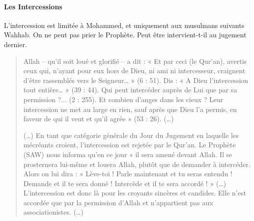 \paragraph{Les Intercessions} L'intercession est limitée à Mohammed, et uniquement aux musulmans suivants Wahhab. On ne peut pas prier le Prophète. Peut être intervient-t-il au jugement dernier.


\begin{quote}
Allah -- qu'il soit loué et glorifié -- a dit : « Et par ceci (le
Qur'an), avertis ceux qui, n'ayant pour eux hors de Dieu, ni ami ni
intercesseur, craignent d'être rassemblés vers le Seigneur\ldots{} » (6
: 51). Dis : « A Dieu l'intercession tout entière\ldots{} » (39 : 44).
Qui peut intercéder auprès de Lui que par sa permission ?... (2 : 255).
Et combien d'anges dans les cieux ? Leur intercession ne met au large en
rien, sauf après que Dieu l'a permis, en faveur de qui il veut et qu'il
agrée » (53 : 26). (\ldots)

(\ldots) En tant que catégorie générale du Jour du Jugement en laquelle
les mécréants croient, l'intercession est rejetée par le Qur'an. Le
Prophète (SAW) nous informa qu'en ce jour « il sera amené devant Allah.
Il se prosternera lui-même et louera Allah, plutôt que de demander à
intercéder. Alors on lui dira : « Lève-toi ! Parle maintenant et tu
seras entendu ! Demande et il te sera donné ! Intercède et il te sera
accordé ! » (\ldots) L'intercession est donc là pour les croyants
sincères et candides. Elle n'est accordée que par la permission d'Allah
et n'appartient pas aux associationistes. (\ldots)
\end{quote}


